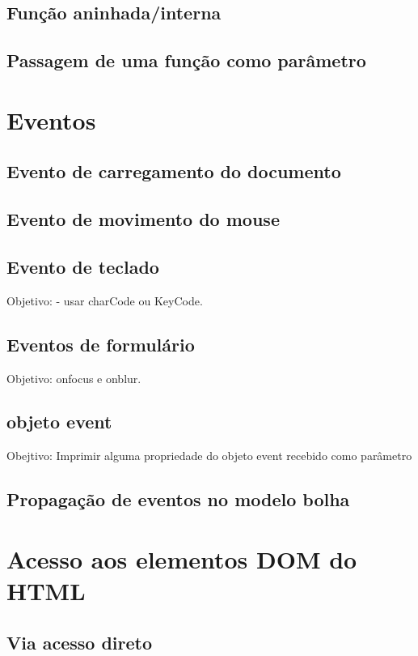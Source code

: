 \subsection{Função aninhada/interna}

\subsection{Passagem de uma função como parâmetro}

\section{Eventos}

\subsection{Evento de carregamento do documento}


\subsection{Evento de movimento do mouse}


\subsection{Evento de teclado}
 Objetivo:  - usar charCode ou KeyCode.
 
 
\subsection{Eventos de formulário}
Objetivo: onfocus e onblur.


\subsection{objeto event}
Obejtivo: Imprimir alguma propriedade do objeto event recebido como parâmetro

\subsection{Propagação de eventos no modelo bolha}

\section{Acesso aos elementos DOM do HTML }

\subsection{Via acesso direto}

